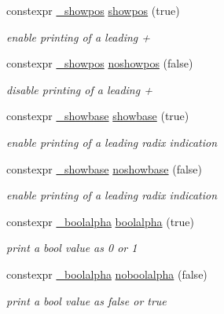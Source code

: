 \begin{DoxyCompactItemize}
constexpr \hyperlink{structhwlib_1_1__showpos}{\+\_\+showpos} \hyperlink{namespacehwlib_a7bb9927f52011b4cc4a90b03e98f95fd}{showpos} (true)
\begin{DoxyCompactList}\small\item\em enable printing of a leading \textquotesingle{}+\textquotesingle{} \end{DoxyCompactList}\item 
constexpr \hyperlink{structhwlib_1_1__showpos}{\+\_\+showpos} \hyperlink{namespacehwlib_accdd72e1358d667a9458767d886b2a53}{noshowpos} (false)
\begin{DoxyCompactList}\small\item\em disable printing of a leading \textquotesingle{}+\textquotesingle{} \end{DoxyCompactList}\item 
constexpr \hyperlink{structhwlib_1_1__showbase}{\+\_\+showbase} \hyperlink{namespacehwlib_a84adb21b2d054d3b70c6b26af5f44566}{showbase} (true)
\begin{DoxyCompactList}\small\item\em enable printing of a leading radix indication \end{DoxyCompactList}\item 
constexpr \hyperlink{structhwlib_1_1__showbase}{\+\_\+showbase} \hyperlink{namespacehwlib_af813ae25dc70ae85e2f06dcf81f8963b}{noshowbase} (false)
\begin{DoxyCompactList}\small\item\em enable printing of a leading radix indication \end{DoxyCompactList}\item 
constexpr \hyperlink{structhwlib_1_1__boolalpha}{\+\_\+boolalpha} \hyperlink{namespacehwlib_a499e8cd6806e66c4c425b64c9512a21c}{boolalpha} (true)
\begin{DoxyCompactList}\small\item\em print a bool value as \textquotesingle{}0\textquotesingle{} or \textquotesingle{}1\textquotesingle{} \end{DoxyCompactList}\item 
constexpr \hyperlink{structhwlib_1_1__boolalpha}{\+\_\+boolalpha} \hyperlink{namespacehwlib_a6fe77cc67d9850cb262eb6e15e37724d}{noboolalpha} (false)
\begin{DoxyCompactList}\small\item\em print a bool value as \textquotesingle{}false\textquotesingle{} or \textquotesingle{}true\textquotesingle{} \end{DoxyCompactList}\item 

\end{DoxyCompactItemize}
